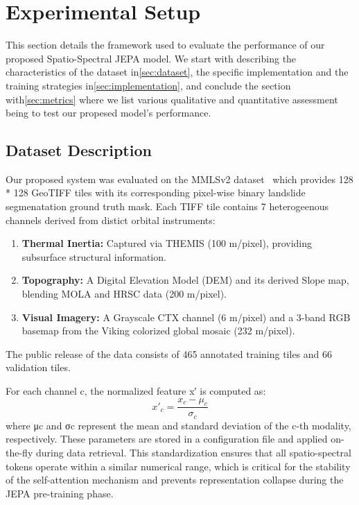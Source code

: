 \section{Experimental Setup}
\label{sec:experiments}

This section details the framework used to evaluate the performance of our proposed Spatio-Spectral JEPA model. We start with describing the characteristics of the dataset in\cref{sec:dataset}, the specific implementation and the training strategies in\cref{sec:implementation}, and conclude the section with\cref{sec:metrics} where we list various qualitative and quantitative assessment being to test our propesed model's performance.

\subsection{Dataset Description}
\label{sec:label}
Our proposed system was evaluated on the MMLSv2 dataset~\cite{mmlsv2_2026} which provides 128 * 128 GeoTIFF tiles with its corresponding pixel-wise binary landslide segmenatation ground truth mask. Each TIFF tile contains 7 heterogeenous channels derived from distict orbital instruments:
\begin{enumerate}
	\item \textbf{Thermal Inertia:} Captured via THEMIS (100 m/pixel), providing subsurface structural information.
	\item \textbf{Topography:} A Digital Elevation Model (DEM) and its derived Slope map, blending MOLA and HRSC data (200 m/pixel).
	\item \textbf{Visual Imagery:} A Grayscale CTX channel (6 m/pixel) and a 3-band RGB basemap from the Viking colorized global mosaic (232 m/pixel).
\end{enumerate}

The public release of the data consists of 465 annotated training tiles and 66 validation tiles.

For each channel c, the normalized feature x′ is computed as:
\begin{equation}
	x'_c = \frac{x_c - \mu_c}{\sigma_c}
\end{equation}
where μc and σc represent the mean and standard deviation of the c-th modality, respectively. These parameters are stored in a configuration file and applied on-the-fly during data retrieval. This standardization ensures that all spatio-spectral tokens operate within a similar numerical range, which is critical for the stability of the self-attention mechanism and prevents representation collapse during the JEPA pre-training phase.


